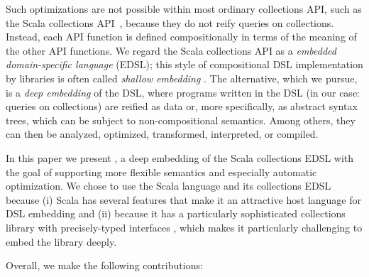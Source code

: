 Such optimizations are not possible within most ordinary collections API, such as the Scala collections API~\cite{odersky2009fighting}, because they
do not reify queries on collections. Instead, each API function is defined compositionally in terms
of the meaning of the other API functions.
We regard the Scala collections API as a \emph{embedded domain-specific language} (EDSL); this style of compositional DSL implementation by libraries is often
called \emph{shallow embedding}%
. The alternative, which we pursue, is a \emph{deep embedding} of the DSL, where programs written in the DSL (in our case:
queries on collections) are reified as data or, more specifically, as abstract syntax trees, which can be subject to non-compositional semantics. Among others, they can then be analyzed, optimized, transformed, interpreted, or compiled.

In this paper we present \LoS, a deep embedding of the Scala collections EDSL with the goal of supporting more flexible semantics and especially automatic optimization.
We chose to use the Scala language and its collections EDSL because (i) Scala has several features that make it an attractive host language for DSL embedding \citep{Odersky11book} and (ii) because it has a particularly sophisticated collections library with precisely-typed interfaces \citep{odersky2009fighting}, which makes it particularly challenging to embed the library deeply.




Overall, we make the following contributions:



